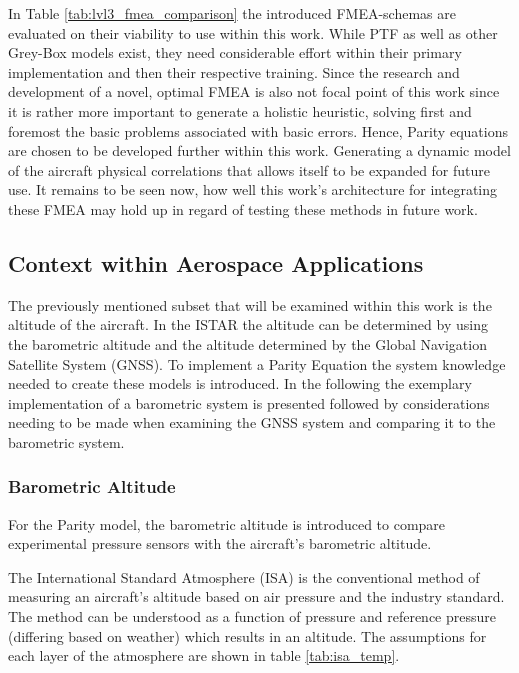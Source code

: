 In Table \ref{tab:lvl3_fmea_comparison} the introduced FMEA-schemas are evaluated on their viability to use within this work. While PTF as well as other Grey-Box models exist, they need considerable effort within their primary implementation and then their respective training. Since the research and development of a novel, optimal FMEA is also not focal point of this work since it is rather more important to generate a holistic heuristic, solving first and foremost the basic problems associated with basic errors. Hence, Parity equations are chosen to be developed further within this work. Generating a dynamic model of the aircraft physical correlations that allows itself to be expanded for future use. It remains to be seen now, how well this work's architecture for integrating these FMEA may hold up in regard of testing these methods in future work.



\subsection{Context within Aerospace Applications}
The previously mentioned subset that will be examined within this work is the altitude of the aircraft. In the ISTAR the altitude can be determined by using the barometric altitude and the altitude determined by the Global Navigation Satellite System (GNSS). To implement a Parity Equation the system knowledge needed to create these models is introduced. In the following the exemplary implementation of a barometric system is presented followed by considerations needing to be made when examining the GNSS system and comparing it to the barometric system.

\subsubsection{Barometric Altitude}
For the Parity model, the barometric altitude is introduced to compare experimental pressure sensors with the aircraft's barometric altitude.

The International Standard Atmosphere (ISA) is the conventional method of measuring an aircraft's altitude based on air pressure and the industry standard. \cite{iso_standard_1975} The method can be understood as a function of pressure and reference pressure (differing based on weather) which results in an altitude. The assumptions for each layer of the atmosphere are shown in table \ref{tab:isa_temp}.

